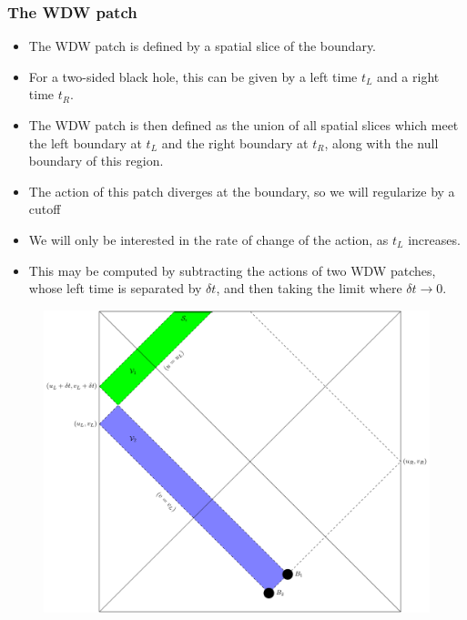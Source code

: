 \documentclass[8pt,aspectratio=169]{beamer}
\begin{document}
\begin{frame}
\frametitle{The WDW patch}

\begin{minipage}[t]{0.5\linewidth}

\begin{itemize}

\item The WDW patch is defined by a spatial slice of the boundary. 

\item For a two-sided black hole, this can be given by a left time $t_L$ and a right time $t_R$.

\item The WDW patch is then defined as the union of all spatial slices which meet the left boundary at $t_L$ and the right boundary at $t_R$, along with the null boundary of this region.

\item The action of this patch diverges at the boundary, so we will regularize by a cutoff

\item We will only be interested in the rate of change of the action, as $t_L$ increases.

\item This may be computed by subtracting the actions of two WDW patches, whose left time is separated by $\delta t$, and then taking the limit where $\delta t \rightarrow 0$.

\end{itemize}

\end{minipage}\hfill
%
\begin{minipage}[t]{0.48\linewidth}

\begin{figure}
    \begin{center}
    
        \includegraphics[scale=0.35]{2WDW.pdf}    
    

\end{center}
\end{figure}
\end{minipage}
\end{frame}
\end{document}

